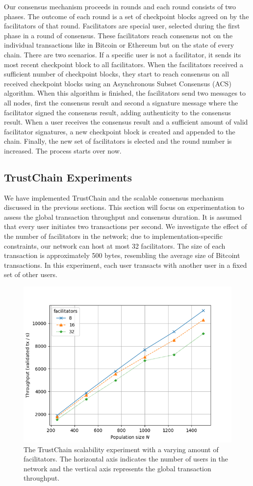 \documentclass[USenglish]{article}
\begin{document}
Our consensus mechanism proceeds in rounds and each round consists of two phases.
The outcome of each round is a set of checkpoint blocks agreed on by the facilitators of that round.
Facilitators are special user, selected during the first phase in a round of consensus.
These facilitators reach consensus not on the individual transactions like in Bitcoin or Ethereum but on the state of every chain.
There are two scenarios.
If a specific user is not a facilitator, it sends its most recent checkpoint block to all facilitators.
When the facilitators received a sufficient number of checkpoint blocks, they start to reach consensus on all received checkpoint blocks using an Asynchronous Subset Consensus (ACS) algorithm.
When this algorithm is finished, the facilitators send two messages to all nodes, first the consensus result and second a signature message where the facilitator signed the consensus result, adding authenticity to the consensus result.
When a user receives the consensus result and a sufficient amount of valid facilitator signatures, a new checkpoint block is created and appended to the chain.
Finally, the new set of facilitators is elected and the round number is increased.
The process starts over now.

\subsection{TrustChain Experiments}

We have implemented TrustChain and the scalable consensus mechanism discussed in the previous sections.
This section will focus on experimentation to assess the global transaction throughput and consensus duration.
It is assumed that every user initiates two transactions per second.
We investigate the effect of the number of facilitators in the network; due to implementation-specific constraints, our network can host at most 32 facilitators.
The size of each transaction is approximately 500 bytes, resembling the average size of Bitcoint transactions.
In this experiment, each user transacts with another user in a fixed set of other users.

\begin{figure}[t]
	\centering
	\includegraphics[width=0.7\columnwidth]{assets/trustchain_scalability}
	\caption{The TrustChain scalability experiment with a varying amount of facilitators. The horizontal axis indicates the number of users in the network and the vertical axis represents the global transaction throughput.}
	\label{fig:trustchain_scalability_experiment}
\end{figure}
\end{document}
